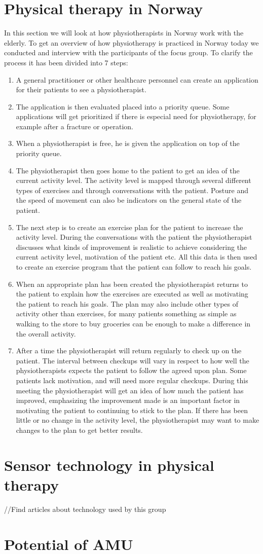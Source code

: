 \section{Physical therapy in Norway}
In this section we will look at how physiotherapists in Norway work with the elderly. To get an overview of how physiotherapy is practiced in Norway today we conducted and interview with the participants of the focus group. To clarify the process it has been divided into 7 steps:
\begin{enumerate}
  \item A general practitioner or other healthcare personnel can create an application for their patients to see a physiotherapist.
  \item The application is then evaluated placed into a priority queue. Some applications will get prioritized if there is especial need for physiotherapy, for example after a fracture or operation.
  \item When a physiotherapist is free, he is given the application on top of the priority queue. 
  \item The physiotherapist then goes home to the patient to get an idea of the current activity level. The activity level is mapped through several different types of exercises and through conversations with the patient. Posture and the speed of movement can also be indicators on the general state of the patient.
  \item The next step is to create an exercise plan for the patient to increase the activity level. During the conversations with the patient the physiotherapist discusses what kinds of improvement is realistic to achieve considering the current activity level, motivation of the patient etc. All this data is then used to create an exercise program that the patient can follow to reach his goals.
  \item When an appropriate plan has been created the physiotherapist returns to the patient to explain how the exercises are executed as well as motivating the patient to reach his goals. The plan may also include other types of activity other than exercises, for many patients something as simple as walking to the store to buy groceries can be enough to make a difference in the overall activity.
  \item After a time the physiotherapist will return regularly to check up on the patient. The interval between checkups will vary in respect to how well the physiotherapists expects the patient to follow the agreed upon plan. Some patients lack motivation, and will need more regular checkups. During this meeting the physiotherapist will get an idea of how much the patient has improved, emphasizing the improvement made is an important factor in motivating the patient to continuing to stick to the plan. If there has been little or no change in the activity level, the physiotherapist may want to make changes to the plan to get better results.
\end{enumerate}

\section{Sensor technology in physical therapy}
//Find articles about technology used by this group

\section{Potential of AMU}
